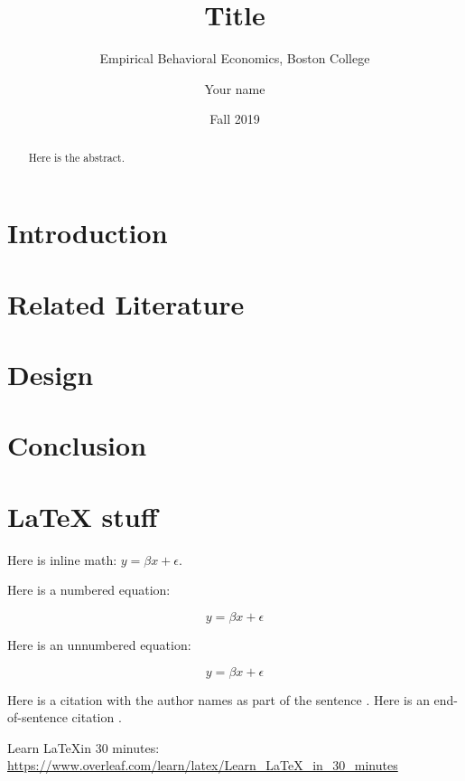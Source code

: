 \documentclass[11pt]{scrartcl}
\title{Title}
\subtitle{Empirical Behavioral Economics, Boston College}
\author{Your name}
\date{Fall 2019}
\begin{document}
\maketitle
\begin{abstract}
Here is the abstract.
\end{abstract}

\section{Introduction}

\section{Related Literature}

\section{Design}

\section{Conclusion}

\section{LaTeX stuff}

Here is inline math: $y = \beta x + \epsilon$.

Here is a numbered equation: 

\begin{equation}
    y = \beta x + \epsilon
\end{equation}

Here is an unnumbered equation:

\begin{equation*}
y = \beta x + \epsilon
\end{equation*}

Here is a citation with the author names as part of the sentence \citet{hamilton2015zoology}. 
Here is an end-of-sentence citation \citep{hamilton2015zoology}.

Learn \LaTeX in 30 minutes: \url{https://www.overleaf.com/learn/latex/Learn_LaTeX_in_30_minutes}

\newpage


\end{document}
